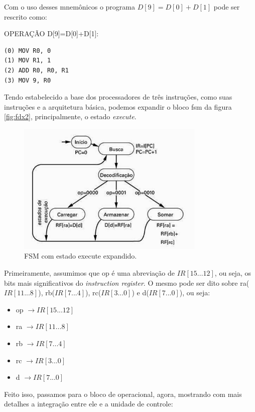 \documentclass{article}
\begin{document}
Com o uso desses mnemônicos o programa $D[9]=D[0]+D[1]$ pode ser rescrito como:

\begin{boxedd}{OPERAÇÃO D[9]=D[0]+D[1]:}
     \begin{lstlisting}
(0) MOV R0, 0
(1) MOV R1, 1
(2) ADD R0, R0, R1
(3) MOV 9, R0
     \end{lstlisting}    
\end{boxedd}

\newpage
Tendo estabelecido a base dos processadores de três instruções, como suas instruções e a arquitetura básica, podemos expandir o bloco fsm da figura \ref{fig:fdx2}, principalmente, o estado \textit{execute}.

\begin{figure}[h!] 
    \centering 
    \includegraphics[width=0.8\textwidth]{fsmExpandida.jpg} 
    \caption{FSM com estado execute expandido.} 
    \label{fig:fsmExpandida} 
\end{figure}

Primeiramente, assumimos que op é uma abreviação de $IR[15...12]$, ou seja, os bits mais significativos do \textit{instruction register}. O mesmo pode ser dito sobre ra($IR[11...8]$), rb($IR[7...4]$), rc($IR[3...0]$) e d($IR[7...0]$), ou seja:
\begin{itemize}
     \item op $ \rightarrow  IR[15...12]$
     \item ra $ \rightarrow IR[11...8]$
     \item rb $ \rightarrow IR[7...4]$
     \item rc $ \rightarrow IR[3...0]$
     \item d $ \rightarrow IR[7...0]$
\end{itemize}

\newpage
Feito isso, passamos para o bloco de operacional, agora, mostrando com mais detalhes a integração entre ele e a unidade de controle:
\end{document}
